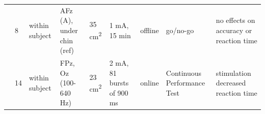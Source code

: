 \documentclass[11pt,english,]{memoir}
\begin{document}
\begin{longtable}[]{@{}lllllllll@{}}
\begin{minipage}[t]{0.08\columnwidth}\raggedright
\textcite{Miller2015}\strut
\end{minipage} & \begin{minipage}[t]{0.02\columnwidth}\raggedright
8\strut
\end{minipage} & \begin{minipage}[t]{0.04\columnwidth}\raggedright
within
subject\strut
\end{minipage} & \begin{minipage}[t]{0.13\columnwidth}\raggedright
AFz (A), under chin (ref)\strut
\end{minipage} & \begin{minipage}[t]{0.03\columnwidth}\raggedright
35
cm\textsuperscript{2}\strut
\end{minipage} & \begin{minipage}[t]{0.05\columnwidth}\raggedright
1 mA, 15
min\strut
\end{minipage} & \begin{minipage}[t]{0.06\columnwidth}\raggedright
offline\strut
\end{minipage} & \begin{minipage}[t]{0.11\columnwidth}\raggedright
go/no-go\strut
\end{minipage} & \begin{minipage}[t]{0.24\columnwidth}\raggedright
no effects on accuracy or reaction time\strut
\end{minipage}\tabularnewline
\begin{minipage}[t]{0.08\columnwidth}\raggedright
\textcite{Mauri2015}\strut
\end{minipage} & \begin{minipage}[t]{0.02\columnwidth}\raggedright
14\strut
\end{minipage} & \begin{minipage}[t]{0.04\columnwidth}\raggedright
within
subject\strut
\end{minipage} & \begin{minipage}[t]{0.13\columnwidth}\raggedright
FPz, Oz (100-640 Hz)\strut
\end{minipage} & \begin{minipage}[t]{0.03\columnwidth}\raggedright
23
cm\textsuperscript{2}\strut
\end{minipage} & \begin{minipage}[t]{0.05\columnwidth}\raggedright
2 mA, 81
bursts of
900 ms\strut
\end{minipage} & \begin{minipage}[t]{0.06\columnwidth}\raggedright
online\strut
\end{minipage} & \begin{minipage}[t]{0.11\columnwidth}\raggedright
Continuous Performance
Test\strut
\end{minipage} & \begin{minipage}[t]{0.24\columnwidth}\raggedright
stimulation decreased reaction time\strut
\end{minipage}\tabularnewline
\bottomrule
\end{longtable}
\end{document}
